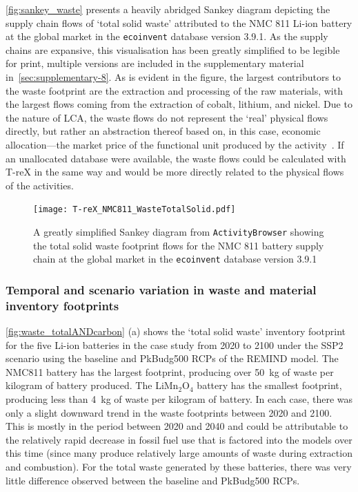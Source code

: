 \documentclass[a4paper,fleqn]{cas-dc}
\begin{document}
	\autoref{fig:sankey_waste} presents a heavily abridged Sankey diagram depicting the supply chain flows of `total solid waste' attributed to the NMC 811 Li-ion battery at the global market in the \texttt{ecoinvent} database version 3.9.1. As the supply chains are expansive, this visualisation has been greatly simplified to be legible for print, multiple versions are included in the supplementary material in~\autoref{sec:supplementary-8}. As is evident in the figure, the largest contributors to the waste footprint are the extraction and processing of the raw materials, with the largest flows coming from the extraction of cobalt, lithium, and nickel. Due to the nature of LCA, the waste flows do not represent the `real' physical flows directly, but rather an abstraction thereof based on, in this case, economic allocation---the market price of the functional unit produced by the activity~\citep{guinee2004economicallocation}. If an unallocated database were available, the waste flows could be calculated with T-reX in the same way and would be more directly related to the physical flows of the activities.
	
	\begin{figure}[!htbp]
		\centering
		\texttt{[image: T-reX\_NMC811\_WasteTotalSolid.pdf]}
		\caption{A greatly simplified Sankey diagram from \texttt{ActivityBrowser} showing the total solid waste footprint flows for the
			NMC 811 battery supply chain at the global market in the \texttt{ecoinvent} database version 3.9.1}\label{fig:sankey_waste}
	\end{figure} 
	
	
	\subsubsection{Temporal and scenario variation in waste and material inventory footprints}
	
	
	\autoref{fig:waste_totalANDcarbon} (a) shows the `total solid waste' inventory footprint for the five Li-ion batteries in the case study from 2020 to 2100 under the SSP2 scenario using the baseline and PkBudg500 RCPs of the REMIND model. The NMC811 battery has the largest footprint, producing over 50~kg of waste per kilogram of battery produced. The  LiMn\(_2\)O\(_4\) battery has the smallest footprint, producing less than 4~kg of waste per kilogram of battery. In each case, there was only a slight downward trend in the waste footprints between 2020 and 2100. This is mostly in the period between 2020 and 2040 and could be attributable to the relatively rapid decrease in fossil fuel use that is factored into the models over this time (since many produce relatively large amounts of waste during extraction and combustion). For the total waste generated by these batteries, there was very little difference observed between the baseline and PkBudg500 RCPs.
	
\end{document}

